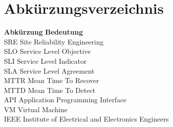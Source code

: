 \documentclass[
12pt,
a4paper,
twoside,
openright
]{report}
\begin{document}
	\tableofcontents
	\listoffigures

	\section*{Abkürzungsverzeichnis}
	\begin{tabbing}
		\textbf{Abkürzung} \hspace{2cm} \= \textbf{Bedeutung} \\
		SRE \> Site Reliability Engineering \\
		SLO \> Service Level Objective \\
		SLI \> Service Level Indicator\\
		SLA \> Service Level Agreement\\
		MTTR \> Mean Time To Recover \\
		MTTD \> Mean Time To Detect \\
		API \> Application Programming Interface \\
		VM \> Virtual Machine\\
		IEEE \> Institute of Electrical and Electronics Engineers\\
	\end{tabbing}	
	
\end{document}
